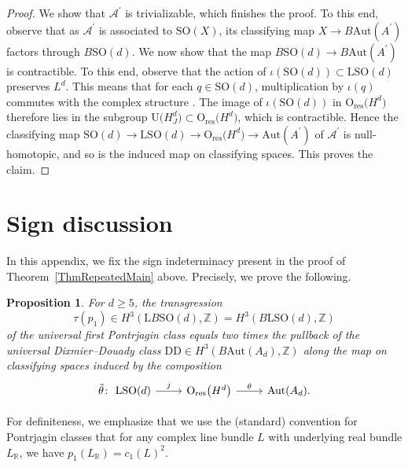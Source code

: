 \documentclass[11pt]{article}
\numberwithin{equation}{section}
\numberwithin{equation}{section}
\newtheorem{Proposition}[Theorem]{Proposition}
\newcommand{\R}{\mathbb{R}}
\newcommand{\Z}{\mathbb{Z}}
\newcommand{\SO}{\mathrm{SO}}
\newcommand{\res}{\mathrm{res}}
\newcommand{\Aut}{\mathrm{Aut}}
\newcommand{\U}{\mathrm{U}}
\renewcommand{\O}{\mathrm{O}}
\renewcommand{\L}{\mathrm{L}}
\newcommand{\DD}{\mathrm{DD}}
\begin{document}
\begin{proof}
We show that $\mathcal{A}^\prime$ is trivializable, which finishes the proof.
To this end, observe that as $\mathcal{A}^\prime$ is associated to $\SO(X)$, its classifying map $X \to B\Aut(A^\prime)$ factors through $B\SO(d)$.
We now show that the map $B\SO(d) \to B\Aut(A^\prime)$ is contractible.
To this end, observe that the action of $\iota(\SO(d)) \subset \L \SO(d)$ preserves $L^d$.
This means that for each $q \in \SO(d)$, multiplication by $\iota(q)$ commutes with the complex structure .
The image of $\iota(\SO(d))$ in $\O_{\res}\big(H^d\big)$ therefore lies in the subgroup $\U\big(H^d_J\big) \subset \O_{\res}\big(H^d\big)$, which is contractible.
Hence the classifying map $\SO(d) \to \L\SO(d) \to \O_{\res}\big(H^d\big) \to \Aut(A^\prime)$ of $\mathcal{A}^\prime$ is null-homotopic, and so is the induced map on classifying spaces.
This proves the claim.
\end{proof}


\appendix

\section{Sign discussion}
\label{AppendixSign}

In this appendix, we fix the sign indeterminacy present in the proof of Theorem~\ref{ThmRepeatedMain} above.
Precisely, we prove the following.

\begin{Proposition}
\label{SignProposition}
For $d\geq 5$, the transgression
\begin{equation*}
\tau(p_1) \in H^3(\L B\SO(d), \Z) = H^3(B\L\SO(d), \Z)
\end{equation*}
of the universal first Pontrjagin class equals two times the pullback of the universal Dixmier--Douady class $\DD \in H^3(B\Aut(A_d), \Z)$ along the map on classifying spaces induced by the composition
\begin{equation*}
\begin{tikzcd}
\tilde{\theta} \colon\ \L\SO(d) \ar[r, "j"] & \O_{\mathrm{res}}\big(H^d\big) \ar[r, "\theta"] & \Aut(A_d).
\end{tikzcd}
\end{equation*}
\end{Proposition}

For definiteness, we emphasize that we use the (standard) convention for Pontrjagin classes that for any complex line bundle $L$ with underlying real bundle $L_\R$, we have $p_1(L_\R) = c_1(L)^2$.
\end{document}
